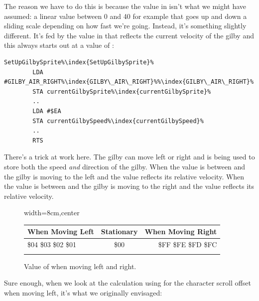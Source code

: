 The reason we have to do this is because the value in  isn't what we might have
assumed: a linear value between 0 and 40 for example that goes up and down a sliding scale depending on
how fast we're going. Instead, it's something slightly different. It's fed by the value in 
that reflects the current velocity of the gilby and this always starts out at a value of :

\begin{lstlisting}[escapechar=\%]
SetUpGilbySprite%\index{SetUpGilbySprite}%
        LDA #GILBY_AIR_RIGHT%\index{GILBY\_AIR\_RIGHT}%%\index{GILBY\_AIR\_RIGHT}%
        STA currentGilbySprite%\index{currentGilbySprite}%
        ..
        LDA #$EA
        STA currentGilbySpeed%\index{currentGilbySpeed}%
        ..
        RTS
\end{lstlisting}

There's a trick at work here. The gilby can move left or right and  is being used to
store both the speed \textit{and} direction of the gilby. When the value is between  and  the gilby is moving
to the left and the value reflects its relative velocity. When the value is between  and  the gilby is
moving to the right and the value reflects its relative velocity.


\begin{figure}[H]
  {
    \setlength{\tabcolsep}{3.0pt}
    \setlength\cmidrulewidth{\heavyrulewidth} %
    \begin{adjustbox}{width=8cm,center}

      \begin{tabular}{lcr}
        \toprule
        When Moving Left & Stationary &  When Moving Right    \\
        \midrule
        \$04 \$03 \$02 \$01 & \$00 & \$FF \$FE \$FD \$FC \\
        \addlinespace
        \bottomrule
      \end{tabular}
    \end{adjustbox}
  }\caption{Value of  when moving left and right.}
\end{figure}
\vspace{-0.05cm}

Sure enough, when we look at the calculation using for the character scroll offset when moving left, it's what we
originally envisaged:

